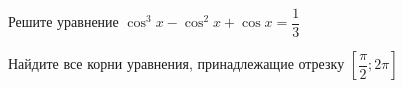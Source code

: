 \begin{ex}
	\begin{condition}
		\begin{enumcols}[label=\asbuk*)]
			\item Решите уравнение \( \cos^3 x -\cos^2 x + \cos x =\dfrac{1}{3} \)
			\item Найдите все корни уравнения, принадлежащие отрезку \( \left[\dfrac{\pi}{2};2\pi\right] \)
		\end{enumcols}
	\end{condition}
\end{ex}